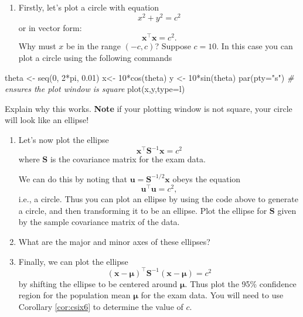 \documentclass[
]{book}
\newenvironment{Shaded}{\begin{snugshade}}{\end{snugshade}}
\newcommand{\AttributeTok}[1]{\textcolor[rgb]{0.77,0.63,0.00}{#1}}
\newcommand{\CommentTok}[1]{\textcolor[rgb]{0.56,0.35,0.01}{\textit{#1}}}
\newcommand{\DecValTok}[1]{\textcolor[rgb]{0.00,0.00,0.81}{#1}}
\newcommand{\FloatTok}[1]{\textcolor[rgb]{0.00,0.00,0.81}{#1}}
\newcommand{\FunctionTok}[1]{\textcolor[rgb]{0.00,0.00,0.00}{#1}}
\newcommand{\NormalTok}[1]{#1}
\newcommand{\OtherTok}[1]{\textcolor[rgb]{0.56,0.35,0.01}{#1}}
\newcommand{\SpecialCharTok}[1]{\textcolor[rgb]{0.00,0.00,0.00}{#1}}
\newcommand{\StringTok}[1]{\textcolor[rgb]{0.31,0.60,0.02}{#1}}
\providecommand{\tightlist}{%
  \setlength{\itemsep}{0pt}\setlength{\parskip}{0pt}}
\theoremstyle{definition}
\theoremstyle{definition}
\theoremstyle{definition}
\theoremstyle{definition}
\theoremstyle{remark}
\begin{document}
\begin{enumerate}
\def\labelenumi{\roman{enumi}.}
\tightlist
\item
  Firstly, let's plot a circle with equation
  \[x^2+y^2=c^2\]
  or in vector form:
  \[\mathbf x^\top\mathbf x=c^2.\]
  Why must \(x\) be in the range \((-c,c)\)? Suppose \(c=10\). In this case you can plot a circle using the following commands
\end{enumerate}

\begin{Shaded}
\begin{Highlighting}[]
\NormalTok{theta }\OtherTok{\textless{}{-}} \FunctionTok{seq}\NormalTok{(}\DecValTok{0}\NormalTok{, }\DecValTok{2}\SpecialCharTok{*}\NormalTok{pi, }\FloatTok{0.01}\NormalTok{)}
\NormalTok{x}\OtherTok{\textless{}{-}} \DecValTok{10}\SpecialCharTok{*}\FunctionTok{cos}\NormalTok{(theta)}
\NormalTok{y }\OtherTok{\textless{}{-}} \DecValTok{10}\SpecialCharTok{*}\FunctionTok{sin}\NormalTok{(theta)}
\FunctionTok{par}\NormalTok{(}\AttributeTok{pty=}\StringTok{"s"}\NormalTok{)  }\CommentTok{\# ensures the plot window is square}
\FunctionTok{plot}\NormalTok{(x,y,}\AttributeTok{type=}\StringTok{\textquotesingle{}l\textquotesingle{}}\NormalTok{)}
\end{Highlighting}
\end{Shaded}

Explain why this works. \textbf{Note} if your plotting window is not square, your circle will look like an ellipse!

\begin{enumerate}
\def\labelenumi{\roman{enumi}.}
\setcounter{enumi}{1}
\item
  Let's now plot the ellipse
  \[\mathbf x^\top \mathbf S^{-1}\mathbf x=c^2\]
  where \(\mathbf S\) is the covariance matrix for the exam data.

  We can do this by noting that \(\mathbf u= \mathbf S^{-1/2}\mathbf x\) obeys the equation
  \[\mathbf u^\top\mathbf u=c^2,\]
  i.e., a circle. Thus you can plot an ellipse by using the code above to generate a circle, and then transforming it to be an ellipse. Plot the ellipse for \(\mathbf S\) given by the sample covariance matrix of the data.
\item
  What are the major and minor axes of these ellipses?
\item
  Finally, we can plot the ellipse
  \[(\mathbf x-{\boldsymbol{\mu}})^\top \mathbf S^{-1}(\mathbf x-{\boldsymbol{\mu}})=c^2\]
  by shifting the ellipse to be centered around \({\boldsymbol{\mu}}\). Thus plot the 95\% confidence region for the population mean \({\boldsymbol{\mu}}\) for the exam data. You will need to use Corollary \ref{cor:csix6} to determine the value of \(c\).
\end{enumerate}
\end{document}
